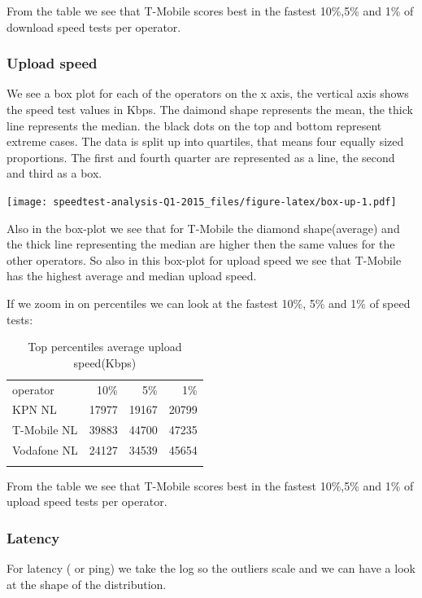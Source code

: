 \documentclass[]{article}
\begin{document}
From the table we see that T-Mobile scores best in the fastest 10\%,5\%
and 1\% of download speed tests per operator.

\subsubsection{Upload speed}\label{upload-speed-1}

We see a box plot for each of the operators on the x axis, the vertical
axis shows the speed test values in Kbps. The daimond shape represents
the mean, the thick line represents the median. the black dots on the
top and bottom represent extreme cases. The data is split up into
quartiles, that means four equally sized proportions. The first and
fourth quarter are represented as a line, the second and third as a box.

\texttt{[image: speedtest-analysis-Q1-2015\_files/figure-latex/box-up-1.pdf]}

Also in the box-plot we see that for T-Mobile the diamond shape(average)
and the thick line representing the median are higher then the same
values for the other operators. So also in this box-plot for upload
speed we see that T-Mobile has the highest average and median upload
speed.

If we zoom in on percentiles we can look at the fastest 10\%, 5\% and
1\% of speed tests:

\begin{longtable}[c]{@{}lrrr@{}}
\toprule\addlinespace
operator & 10\% & 5\% & 1\%
\\\addlinespace
\midrule\endhead
KPN NL & 17977 & 19167 & 20799
\\\addlinespace
T-Mobile NL & 39883 & 44700 & 47235
\\\addlinespace
Vodafone NL & 24127 & 34539 & 45654
\\\addlinespace
\bottomrule
\addlinespace
\caption{Top percentiles average upload speed(Kbps)}
\end{longtable}

From the table we see that T-Mobile scores best in the fastest 10\%,5\%
and 1\% of upload speed tests per operator.

\subsubsection{Latency}\label{latency-1}

For latency ( or ping) we take the log so the outliers scale and we can
have a look at the shape of the distribution.
\end{document}

